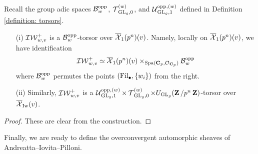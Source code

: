 Recall the group adic spaces $\calB^{\opp}_w$, $\calT_{\GL_g,0}^{(w)}$, and $\calU^{\opp, (w)}_{\GL_g,1}$ defined in Definition \ref{definition: torsors}.

\begin{Lemma}
\begin{enumerate} 
\item[(i)] $\adicIW_{w,v}^+$ is a $\calB^{\opp}_w$-torsor over $\overline{\calX}_1(p^n)(v)$. Namely, locally on $\overline{\calX}_1(p^n)(v)$, we have identification
$$\adicIW_{w,v}^+\simeq \overline{\calX}_1(p^n)(v)\times_{\Spa(\C_p, \calO_{\C_p})}\calB^{\opp}_w$$
where $\calB^{\opp}_w$ permutes the points $\left(\Fil_{\bullet}, \{w_i\}\right)$ from the right. 

\item[(ii)] Similarly, $\adicIW_{w,v}^+$ is a $\calU^{\opp, (w)}_{\GL_g,1}\times\calT_{\GL_g,0}^{(w)}\times U_{\GL_g}(\Z/p^n\Z)$-torsor over $\overline{\calX}_{\Iw}(v)$. 
\end{enumerate}
\end{Lemma}

\begin{proof}
These are clear from the construction. 
\end{proof}

Finally, we are ready to define the overconvergent automorphic sheaves of Andreatta--Iovita--Pilloni.

